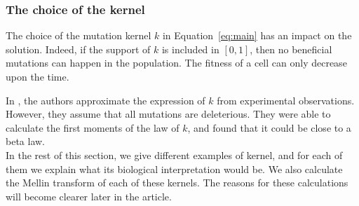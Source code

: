 \documentclass[11pt]{amsart}
\begin{document}
    \subsubsection{The choice of the kernel}

    The choice of the mutation kernel $k$ in Equation~\eqref{eq:main} has an impact on the solution. Indeed, if the support of $k$ is included in $[0, 1]$, then no beneficial mutations can happen in the population. The fitness of a cell can only decrease upon the time. 

    In \cite{robert2018mutation}, the authors approximate the expression of $k$ from experimental observations. However, they assume that all mutations are deleterious. They were able to calculate the first moments of the law of $k$, and found that it could be close to a beta law. \\

    In the rest of this section, we give different examples of kernel, and for each of them we explain what its biological interpretation would be. We also calculate the Mellin transform of each of these kernels. The reasons for these calculations will become clearer later in the article. \\
\end{document}
